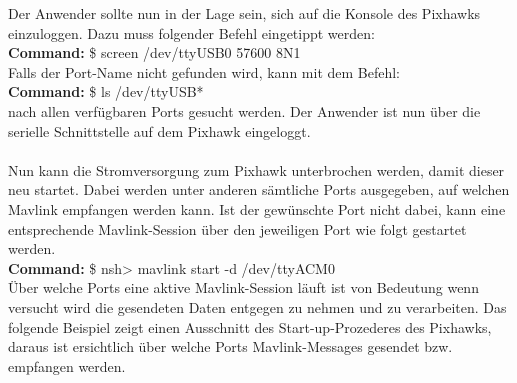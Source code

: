 \documentclass[12pt]{article} %
\begin{document}
	Der Anwender sollte nun in der Lage sein, sich auf die Konsole des Pixhawks einzuloggen. Dazu muss folgender Befehl eingetippt werden:
	\\[0.2cm]
	\noindent\hspace*{30mm} \textbf{Command:} \$ screen /dev/ttyUSB0 57600 8N1
	\\[0.2cm]
	Falls der Port-Name nicht gefunden wird, kann mit dem Befehl:
	\\[0.2cm]
	\noindent\hspace*{30mm} \textbf{Command:} \$ ls /dev/ttyUSB*
	\\[0.2cm]
	nach allen verfügbaren Ports gesucht werden. Der Anwender ist nun über die serielle Schnittstelle auf dem Pixhawk eingeloggt.\\
	\\
	Nun kann die Stromversorgung zum Pixhawk unterbrochen werden, damit dieser neu startet. Dabei werden unter anderen sämtliche Ports ausgegeben, auf welchen Mavlink empfangen werden kann. Ist der gewünschte Port nicht dabei, kann eine entsprechende Mavlink-Session über den jeweiligen Port wie folgt gestartet werden.
	\\[0.2cm]
	\noindent\hspace*{30mm} \textbf{Command:} \$ nsh> mavlink start -d /dev/ttyACM0
	\\[0.2cm]
	Über welche Ports eine aktive Mavlink-Session läuft ist von Bedeutung wenn versucht wird die gesendeten Daten entgegen zu nehmen und zu verarbeiten. Das folgende Beispiel zeigt einen Ausschnitt des Start-up-Prozederes des Pixhawks, daraus ist ersichtlich über welche Ports Mavlink-Messages gesendet bzw. empfangen werden.
	
\end{document}

